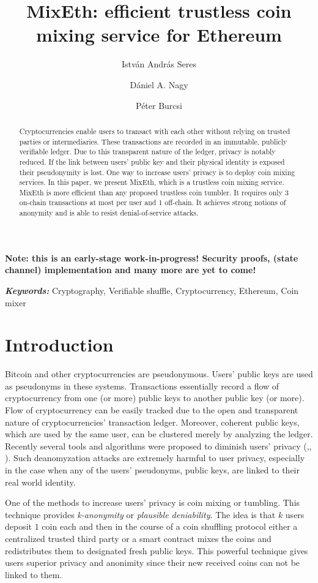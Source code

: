 \documentclass[a4paper]{article}
\title{MixEth: efficient trustless coin mixing service for Ethereum}
\author[1]{István András Seres}
\author[1]{Dániel A. Nagy}
\author[1]{Péter Burcsi}
\affil[1]{Department of Computer Algebra, Eötvös Loránd University}
\theoremstyle{definition}
\providecommand{\keywords}[1]{\textbf{\textit{Keywords:}} #1}
\begin{document}
\maketitle


\textbf{Note: this is an early-stage work-in-progress! Security proofs, (state channel) implementation and many more are yet to come!} 
\begin{abstract}
Cryptocurrencies enable users to transact with each other without relying on trusted parties or intermediaries. These transactions are recorded in an immutable, publicly verifiable ledger. Due to this transparent nature of the ledger, privacy is notably reduced. If the link between users' public key and their physical identity is exposed  their pseudonymity is lost. One way to increase users' privacy is to deploy coin mixing services. In this paper, we present MixEth, which is a trustless coin mixing service. MixEth is more efficient than any proposed trustless coin tumbler. It requires only $3$ on-chain transactions at most per user and $1$ off-chain. It achieves strong notions of anonymity and is able to resist denial-of-service attacks.      
\end{abstract}
\keywords{Cryptography, Verifiable shuffle, Cryptocurrency, Ethereum, Coin mixer}

\section{Introduction}
Bitcoin \cite{nakamoto2008bitcoin} and other cryptocurrencies are pseudonymous. Users' public keys are used as pseudonyms in these systems. Transactions essentially record a flow of cryptocurrency from one (or more) public keys to another public key (or more). Flow of cryptocurrency can be easily tracked due to the open and transparent nature of cryptocurrencies' transaction ledger. Moreover, coherent public keys, which are used by the same user, can be clustered merely by analyzing the ledger. Recently several tools and algorithms were proposed to diminish users' privacy (\cite{meiklejohn2013fistful},\cite{moser2013inquiry}, \cite{moreno2016listening}). Such deanomyzation attacks are extremely harmful to user privacy, especially in the case when any of the users' pseudonyms, public keys, are linked to their real world identity. 

One of the methods to increase users' privacy is coin mixing or tumbling. This technique provides \textit{k-anonymity} or \textit{plausible deniability}. The idea is that $k$ users deposit $1$ coin each and then in the course of a coin shuffling protocol either a centralized trusted third party or a smart contract mixes the coins and redistributes them to designated fresh public keys. This powerful technique gives users superior privacy and anonimity since their new received coins can not be linked to them.
\end{document}
